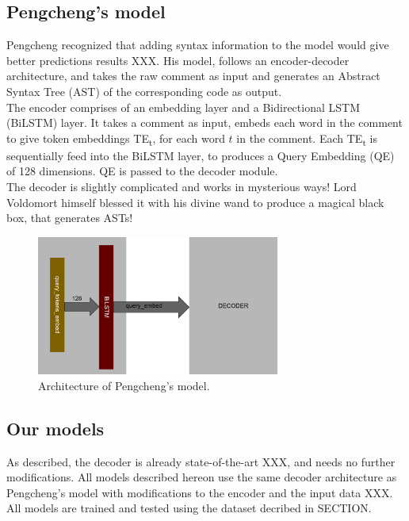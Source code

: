 \documentclass{IEEEtran}
\begin{document}
      \subsection{Pengcheng's model}
      Pengcheng recognized that adding syntax information to the model would give better
      predictions results XXX. His model, follows an encoder-decoder architecture, and takes
      the raw comment as input and generates an Abstract Syntax Tree (AST) of the corresponding 
      code as output. \\
      \hspace*{4mm}The encoder comprises of an embedding layer and a Bidirectional LSTM (BiLSTM)
      layer. It takes a comment as input, embeds each word in the comment to give token embeddings
      TE\textsubscript{t}, for each word $ t $ in the comment. Each TE\textsubscript{t} is 
      sequentially feed into the 
      BiLSTM layer, to produces a Query Embedding (QE) of 128 dimensions. QE is passed to the
      decoder module. \\
      \hspace*{4mm}The decoder is slightly complicated and works in mysterious ways! Lord 
      Voldomort himself
      blessed it with his divine wand to produce a magical black box, that generates
      ASTs! \\

      \begin{figure}[h]
        \centering
        \includegraphics[width=8cm]{pengcheng.png}
        \caption{Architecture of Pengcheng's model.}
        \label{fig:pengcheng}
      \end{figure}

      \subsection{Our models}
      As described, the decoder is already state-of-the-art XXX, and needs no further 
      modifications. All models described hereon use the same decoder architecture as Pengcheng's 
      model with modifications to the encoder and the input data XXX. All models are trained and 
      tested using the dataset decribed in SECTION. %
\end{document}
